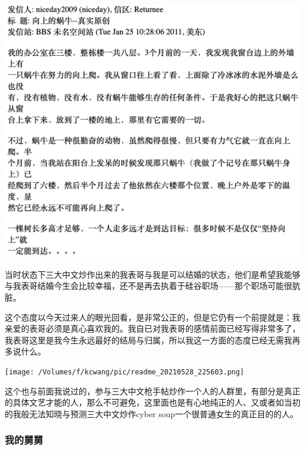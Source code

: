 \documentclass[9pt, b5paper]{article}
\begin{document}
\begin{center}
\includegraphics[width=.9\linewidth]{./pic/readme_20210520_095054.png}
\end{center}

当时状态下三大中文炒作出来的我表哥与我是可以结婚的状态，他们是希望我能够与我表哥结婚今生会比较幸福，还不是再去执着于硅谷职场——那个职场可能很肮脏。

这个态度以今天过来人的眼光回看，是非常公正的，但是它仍有一个前提就是：我亲爱的表哥必须是真心喜欢我的。我自已对我表哥的感情前面已经写得非常多了，我表哥这里是我今生永远最好的结局与归属，所以我这一方面的态度已经无需我再多说什么。

\begin{center}
\texttt{[image: /Volumes/f/kcwang/pic/readme\_20210528\_225603.png]}
\end{center}

这个也与前面我说过的，参与三大中文枪手帖炒作一个人的人群里，有部分是真正的具体文艺才能的人，那么不可避免，这里面也是有心地纯正的人、又或者如当初的我般无法知晓与预测三大中文炒作cyber soup一个很普通女生的真正目的的人。 

\subsubsection{我的舅舅}
\label{sec:org8b4d7eb}
\end{document}

